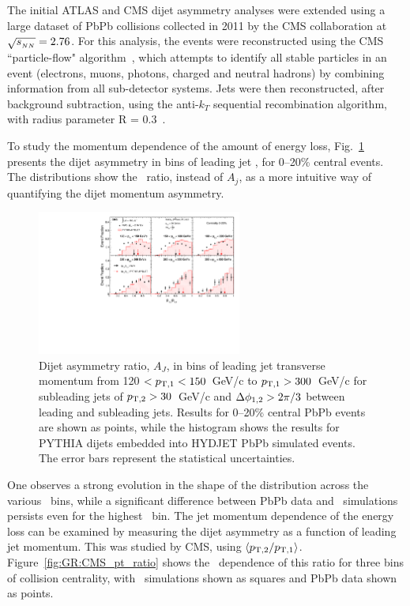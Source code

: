 The initial ATLAS and CMS dijet asymmetry analyses were extended using a large dataset of PbPb collisions
collected in 2011 by the CMS collaboration at $\sqrt{s_{_{NN}}}=2.76$\TeV. For this analysis, the events were 
reconstructed using the  CMS ``particle-flow" algorithm~\cite{CMS-PAS-PFT-10-002,MattPFlow}, 
which attempts to identify all stable particles in an
event (electrons, muons, photons, charged and neutral hadrons)
by combining information from all sub-detector systems.
Jets were then reconstructed, after background subtraction, using the anti-$k_T$ sequential recombination algorithm, 
with radius parameter R = 0.3~\cite{Cacciari:2008gp}.

To study the momentum dependence of the amount of energy loss,
Fig.~\ref{fig:GR:CMS_dijet_pt} presents the dijet asymmetry in bins of leading jet
\pT, for 0--20\% central events. 
The distributions show the \ptrat\ ratio, instead of $A_j$,  as a more intuitive 
way of quantifying the dijet momentum asymmetry.

\begin{figure}[!h]
\begin{center}
\includegraphics[width=0.6\textwidth]{jetfigures/dijet_imbalance5_0to20_pt_20120103_subt.pdf}
\caption{Dijet asymmetry ratio, $A_{J}$, in bins of leading jet transverse momentum from
120 $ < p_{\rm{T},1} < 150$~GeV/c to $p_{\rm{T},1} > 300$~GeV/c for
  subleading jets of $p_{\rm{T},2}> 30$~GeV/c
and $\Delta\phi_{1,2}>2\pi/3$ between leading and subleading jets.
Results for 0--20\% central PbPb events are shown as points, while the histogram
shows the results for
PYTHIA dijets embedded into HYDJET PbPb simulated events. The error bars represent the statistical uncertainties.}
\label{fig:GR:CMS_dijet_pt}
\end{center}
\end{figure}
One observes a strong evolution in the shape of the distribution across the
various \pT\ bins, while a significant difference between PbPb data and 
\PYTHYD\ simulations persists even for the highest \pT\ bin. 
The jet momentum dependence of the energy loss can be examined by measuring the
dijet asymmetry as a function of leading jet momentum. This was studied by CMS,
using $\langle p_{\rm{T},2}/p_{\rm{T},1} \rangle$. Figure~\ref{fig:GR:CMS_pt_ratio} 
shows the \pT\ dependence of this ratio for three 
bins of collision centrality, with \PYTHYD\ simulations shown 
as squares and PbPb data shown as points. 

